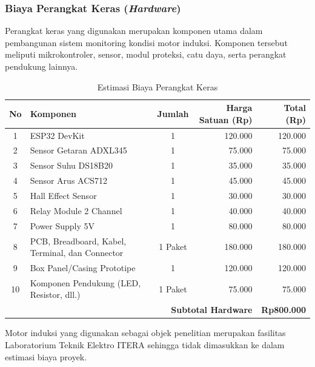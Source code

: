 \documentclass{elsinta}
\begin{document}
\subsubsection{Biaya Perangkat Keras (\textit{Hardware})}

Perangkat keras yang digunakan merupakan komponen utama dalam pembangunan sistem monitoring kondisi motor induksi. Komponen tersebut meliputi mikrokontroler, sensor, modul proteksi, catu daya, serta perangkat pendukung lainnya.

\begin{table}[H]
\centering
\caption{Estimasi Biaya Perangkat Keras}
\label{tab:harga}
\renewcommand{\arraystretch}{1.3}

\begin{tabular}{|c|p{5.8cm}|c|r|r|}
\hline
\textbf{No} &
\centering\textbf{Komponen} &
\textbf{Jumlah} &
\textbf{Harga Satuan (Rp)} &
\textbf{Total (Rp)}\\
\hline

1 & ESP32 DevKit & 1 & 120.000 & 120.000\\
\hline
2 & Sensor Getaran ADXL345 & 1 & 75.000 & 75.000\\
\hline
3 & Sensor Suhu DS18B20 & 1 & 35.000 & 35.000\\
\hline
4 & Sensor Arus ACS712 & 1 & 45.000 & 45.000\\
\hline
5 & Hall Effect Sensor & 1 & 30.000 & 30.000\\
\hline
6 & Relay Module 2 Channel & 1 & 40.000 & 40.000\\
\hline
7 & Power Supply 5V & 1 & 80.000 & 80.000\\
\hline
8 & PCB, Breadboard, Kabel, Terminal, dan Connector & 1 Paket & 180.000 & 180.000\\
\hline
9 & Box Panel/Casing Prototipe & 1 & 120.000 & 120.000\\
\hline
10 & Komponen Pendukung (LED, Resistor, dll.) & 1 Paket & 75.000 & 75.000\\
\hline

\multicolumn{4}{|r|}{\textbf{Subtotal Hardware}} &
\textbf{Rp800.000}\\
\hline

\end{tabular}
\end{table}

Motor induksi yang digunakan sebagai objek penelitian merupakan fasilitas Laboratorium Teknik Elektro ITERA sehingga tidak dimasukkan ke dalam estimasi biaya proyek.

\end{document}
